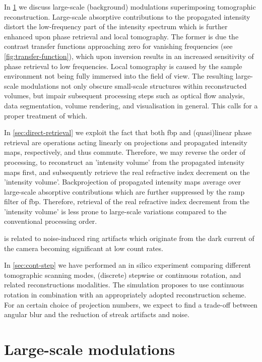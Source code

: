 \documentclass[
twoside,
openright,
titlepage,
numbers=noenddot,
headinclude,
fleqn,
a4paper,
footinclude=true,
cleardoublepage=empty,
abstractoff,
BCOR=5mm,
paper=a4,
fontsize=11pt,
british,ngerman,american,
]{scrreprt}
\begin{document}
In \cref{sec:lsv} we discuss large-scale (background) modulations
superimposing tomographic reconstruction.  Large-scale absorptive
contributions to the propagated intensity distort the low-frequency
part of the intensity spectrum which is further enhanced upon phase
retrieval and local tomography.  The former is due the contrast
transfer functions approaching zero for vanishing frequencies (see
\cref{fig:transfer-function}), which upon inversion results in an
increased sensitivity of phase retrieval to low frequencies.  Local
tomography is caused by the sample environment not being fully
immersed into the field of view.  The resulting large-scale
modulations not only obscure small-scale structures within
reconstructed volumes, but impair subsequent processing steps such as
optical flow analysis, data segmentation, volume rendering, and
visualisation in general.  This calls for a proper treatment of which.

In \cref{sec:direct-retrieval} we exploit the fact that both \ac{fbp}
and (quasi)linear phase retrieval are operations acting linearly on
projections and propagated intensity maps, respectively, and thus
commute.  Therefore, we may reverse the order of processing, \ie{} to
reconstruct an 'intensity volume' from the propagated intensity maps
first, and subsequently retrieve the real refractive index decrement
on the 'intensity volume'.  Backprojection of propagated intensity
maps average over large-scale absorptive contributions which are
further suppressed by the ramp filter of \ac{fbp}.  Therefore,
retrieval of the real refractive index decrement from the 'intensity
volume' is less prone to large-scale variations compared to the
conventional processing order.

 is related to noise-induced ring artifacts
which originate from the dark current of the camera becoming
significant at low count rates.

In \cref{sec:cont-step} we have performed an in silico experiment
comparing different tomographic scanning modes, \ie{} (discrete)
stepwise or continuous rotation, and related reconstructions
modalities.  The simulation proposes to use continuous rotation in
combination with an appropriately adopted reconstruction scheme.  For
an certain choice of projection numbers, we expect to find a trade-off
between angular blur and the reduction of streak artifacts and noise.

\section{Large-scale modulations}
\label{sec:lsv}
\end{document}
